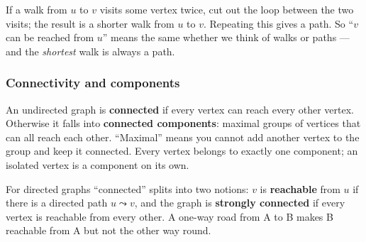 \begin{insightbox}
If a walk from $u$ to $v$ visits some vertex twice, cut out the loop between the two visits; the result is a shorter walk from $u$ to $v$. Repeating this gives a path. So ``$v$ can be reached from $u$'' means the same whether we think of walks or paths --- and the \emph{shortest} walk is always a path.
\end{insightbox}

\subsubsection*{Connectivity and components}

An undirected graph is \textbf{connected} if every vertex can reach every other vertex. Otherwise it falls into \textbf{connected components}: maximal groups of vertices that can all reach each other. ``Maximal'' means you cannot add another vertex to the group and keep it connected. Every vertex belongs to exactly one component; an isolated vertex is a component on its own.

\begin{diagrambox}
\end{diagrambox}

For directed graphs ``connected'' splits into two notions: $v$ is \textbf{reachable} from $u$ if there is a directed path $u\leadsto v$, and the graph is \textbf{strongly connected} if every vertex is reachable from every other. A one-way road from A to B makes B reachable from A but not the other way round.

